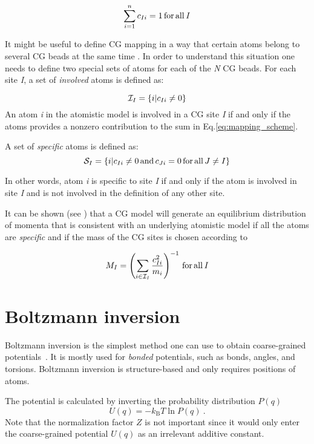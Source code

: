 \begin{equation}
 \sum_{i=1}^{n}c_{Ii}=1\, \rm for\, all\, \it I
\end{equation}

It might be useful to define CG mapping in a way that certain atoms belong to several CG beads at the same time \cite{Fritz:2009}.
In order to understand this situation one needs to define two special sets of atoms for each of the {\it N} CG beads. For each site {\it I}, a set of {\it involved} atoms is defined as:

\begin{equation}
 {\cal I}_I=\{i|c_{Ii}\ne0\}
\end{equation}
An atom {\it i} in the atomistic model is involved in a CG site {\it I} if and only if the atoms provides a nonzero contribution to the sum in Eq.\ref{eq:mapping_scheme}.

A set of {\it specific} atoms is defined as:
\begin{equation}
 {\cal S}_I=\{i|c_{Ii}\ne0\, {\rm and}\, c_{Ji}=0\, {\rm for\,all}\, J\ne I\}
\end{equation}

In other words, atom {\it i} is specific to site {\it I} if and only if the atom is involved in site {\it I} and is not involved in the definition of any other site.

It can be shown (see \cite{Noid:2008.1}) that a CG model will generate an equilibrium distribution of momenta that is consistent with an underlying atomistic model if all the atoms are {\it specific} and if the mass of the CG sites is chosen according to

\begin{equation}
M_I= \left( \sum_{i \in {\cal I}_I}\frac{c_{Ii}^2}{m_i} \right)^{-1}\, \rm for\, all\, {\it I}
\end{equation}

\section{Boltzmann inversion}
Boltzmann inversion is the simplest method one can use to obtain coarse-grained potentials~\cite{Tschoep:1998}. It is mostly used for {\em bonded} potentials, such as bonds, angles, and torsions. Boltzmann inversion is structure-based and only requires positions of atoms.

The potential is calculated by inverting the probability distribution $P(q)$ 
\begin{equation}
  U(q) = - k_\text{B} T \ln  P(q) ~.
  \label{eq:inv_boltzmann}
\end{equation}
%
Note that the normalization factor $Z$ is not important since it would only enter the coarse-grained potential $U(q)$ as an irrelevant additive constant.

